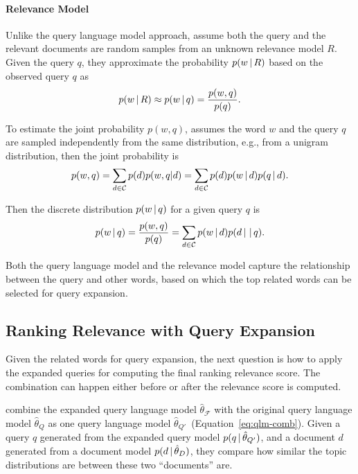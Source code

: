 \paragraph{Relevance Model}

Unlike the query language model approach,
\citet{Lavrenko-2001} assume both the query and the relevant documents
are random samples from an unknown relevance model $R$. Given the
query $q$, they approximate the probability $p(w \, | \, R)$ based on the
observed query $q$ as 
\begin{align}
p(w \, | \, R) \approx p(w \, | \, q) = \frac{p(w,q)}{p(q)}.
\end{align}

To estimate the joint probability $p(w, q)$, \citet{Lavrenko-2001}
assumes the word $w$ and the query $q$ are sampled independently from
the same distribution, e.g., from a unigram distribution, then the
joint probability is
\begin{align}
p(w, q) = \sum_{d \in \mathcal{C}} p(d) p(w,q |d) = \sum_{d \in
  \mathcal{C}} p(d) p(w \, | \, d) p(q \, | \, d).
\end{align}

Then the discrete distribution $p(w \, | \, q)$ for a given query $q$ is
\begin{align}
\label{eq:rm_qe}
p(w \, | \, q) = \frac{p(w, q)}{p(q)} = \sum_{d \in \mathcal{C}} p(w \, | \, d) p(d
  \, | \, \, | \, q).
\end{align}

Both the query language model and the relevance model capture the
relationship between the query and other words, based on which the top
related words can be selected for query expansion.

\subsection{Ranking Relevance with Query Expansion}

Given the related words for query expansion, the next question is how
to apply the expanded queries for computing the final ranking
relevance score. The combination can happen either before or after the
relevance score is computed.

\citet{zhai-01b} combine the expanded query language model
$\hat{\theta}_{\mathcal{F}}$ with the original query language model
$\hat{\theta}_{Q}$ as one query language model $\hat{\theta}_{Q'}
$~(Equation~\ref{eq:qlm-comb}). Given a query $q$ generated from the
expanded query model $p(q \, | \, \hat{\theta}_{Q'})$, and a document $d$
generated from a document model $p(d \, | \, \hat{\theta}_D)$, they compare
how similar the topic distributions are between these two
``documents'' are.

